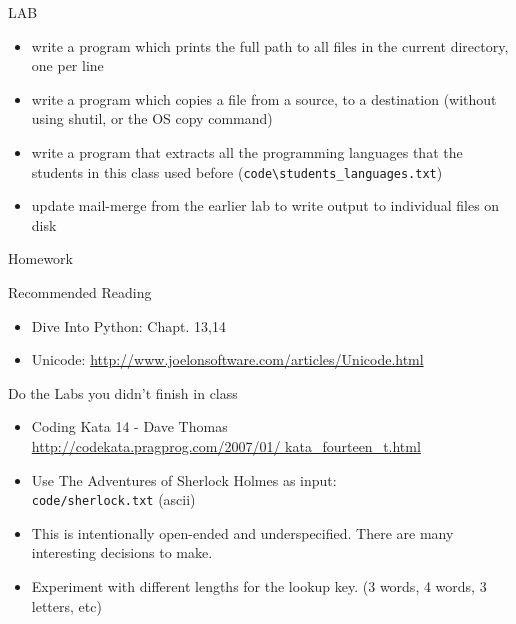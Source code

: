 \documentclass{beamer}
\begin{document}
\begin{frame}[fragile]{LAB}

\begin{itemize}
  \item write a program which prints the full path to all files
    in the current directory, one per line
  \item write a program which copies a file from a source, to a
        destination (without using shutil, or the OS copy command)
  \item write a program that extracts all the programming languages that the students in this class used before (\verb|code\students_languages.txt|) 
  \item update mail-merge from the earlier lab to write output
         to individual files on disk
\end{itemize}

\end{frame}


\begin{frame}[fragile]{Homework}

{\large Recommended Reading}
\begin{itemize}
  \item Dive Into Python: Chapt. 13,14
  \item Unicode: \url{http://www.joelonsoftware.com/articles/Unicode.html}
\end{itemize}

\vfill
{\large Do the Labs you didn't finish in class}

\vfill
\begin{itemize}
  \item Coding Kata 14 - Dave Thomas \\
    \url{http://codekata.pragprog.com/2007/01/ kata_fourteen_t.html}

  \item Use The Adventures of Sherlock Holmes as input:\\
        \verb|code/sherlock.txt| (ascii)

  \item  This is intentionally open-ended and underspecified. There are many interesting decisions to make.

  \item Experiment with different lengths for the lookup key. (3 words, 4 words, 3 letters, etc)
\end{itemize}

\end{frame}
\end{document}
